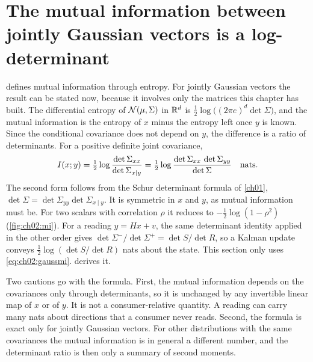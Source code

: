 
\section{The mutual information between jointly Gaussian vectors is a log-determinant}\label{sec:ch02:mi}

 defines mutual information through entropy. For jointly Gaussian
vectors the result can be stated now, because it involves only the matrices
this chapter has built. The differential entropy of $\mathcal{N}(\mu,\Sigma)$ in
$\mathbb{R}^d$ is $\tfrac12\log\big((2\pi e)^d\det\Sigma\big)$, and the mutual
information is the entropy of $x$ minus the entropy left once $y$ is known.
Since the conditional covariance does not depend on $y$, the difference is a
ratio of determinants. For a positive definite joint covariance,
\begin{equation}\label{eq:ch02:gaussmi}
I(x;y)=\tfrac12\log\frac{\det\Sigma_{xx}}{\det\Sigma_{x\mid y}}
=\tfrac12\log\frac{\det\Sigma_{xx}\,\det\Sigma_{yy}}{\det\Sigma}\quad\text{nats}.
\end{equation}
The second form follows from the Schur determinant formula of \cref{ch01},
$\det\Sigma=\det\Sigma_{yy}\det\Sigma_{x\mid y}$. It is symmetric in $x$ and
$y$, as mutual information must be. For two scalars with correlation $\rho$
it reduces to $-\tfrac12\log(1-\rho^2)$ (\cref{fig:ch02:mi}). For a reading $y=Hx+v$, the same
determinant identity applied in the other order gives
$\det\Sigma^-/\det\Sigma^+=\det S/\det R$, so a Kalman update conveys
$\tfrac12\log(\det S/\det R)$ nats about the state. This section only uses
\cref{eq:ch02:gaussmi}.  derives it.

Two cautions go with the formula. First, the mutual information depends on the
covariances only through determinants, so it is unchanged by any invertible
linear map of $x$ or of $y$. It is not a consumer-relative quantity. A reading
can carry many nats about directions that a consumer never reads. Second, the
formula is exact only for jointly Gaussian vectors. For other distributions
with the same covariances the mutual information is in general a different
number, and the determinant ratio is then only a summary of second moments.

